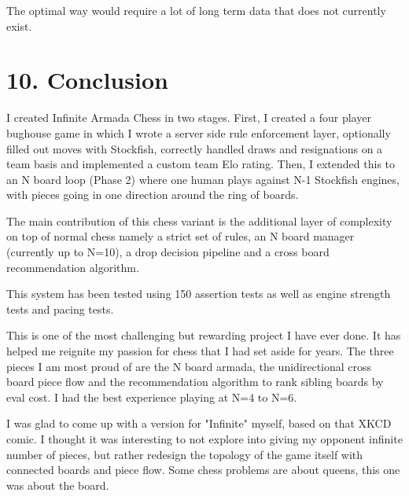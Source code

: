 \documentclass[11pt,a4paper]{article}
\begin{document}
The optimal way would require a lot of long term data that does not currently exist.

\newpage
\section*{10. Conclusion}
I created Infinite Armada Chess in two stages. First, I created a four player bughouse game in which I wrote a server side rule enforcement layer, optionally filled out moves with Stockfish, correctly handled draws and resignations on a team basis and implemented a custom team Elo rating. Then, I extended this to an N board loop (Phase 2) where one human plays against N-1 Stockfish engines, with pieces going in one direction around the ring of boards.

The main contribution of this chess variant is the additional layer of complexity on top of normal chess namely a strict set of rules, an N board manager (currently up to N=10), a drop decision pipeline and a cross board recommendation algorithm.

This system has been tested using 150 assertion tests as well as engine strength tests and pacing tests.

This is one of the most challenging but rewarding project I have ever done. It has helped me reignite my passion for chess that I had set aside for years. The three pieces I am most proud of are the N board armada, the unidirectional cross board piece flow and the recommendation algorithm to rank sibling boards by eval cost. I had the best experience playing at N=4 to N=6. 

I was glad to come up with a version for "Infinite" myself, based on that XKCD comic. I thought it was interesting to not explore into giving my opponent infinite number of pieces, but rather redesign the topology of the game itself with connected boards and piece flow. Some chess problems are about queens, this one was about the board.

\newpage
\end{document}
